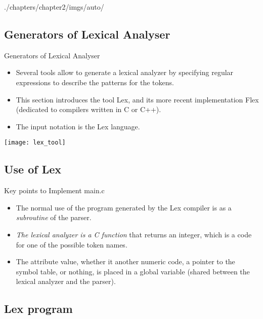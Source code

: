 \begin{graphicspathcontext}{{./chapters/chapter2/imgs/auto/}}
\begin{bibunit}[apalike]
\tableofcontentslide[sections={1-5},sectionstyle={show/shaded},subsectionstyle={show/show/hide},subsubsectionstyle={hide/hide/hide/hide}]

\subsection{Generators of Lexical Analyser}

\begin{frame}{Generators of Lexical Analyser}
	\begin{itemize}
	\item Several tools allow to generate a lexical analyzer by specifying regular expressions to describe the patterns for the tokens.
	\item This section introduces the tool Lex, and its more recent implementation Flex (dedicated to compilers written in C or C++).
	\item The input notation is the Lex language.
	\end{itemize}
	\vfill
	\texttt{[image: lex\_tool]}
\end{frame}

\subsection{Use of Lex}

\tableofcontentslide[sections={1-5},sectionstyle={show/shaded},subsectionstyle={show/shaded/hide},subsubsectionstyle={hide/hide/hide/hide}]


\begin{frame}{Key points to Implement main.c}
	\begin{itemize}
	\item The normal use of the program generated by the Lex compiler is as a \emph{subroutine} of the parser.
	\vfill
	\item \emph{The lexical analyzer is a C function} that returns an integer, which is a code for one of the possible token names.
	\vfill
	\item The attribute value, whether it another numeric code, a pointer to the symbol table, or nothing, is placed in a global variable  (shared between the lexical analyzer and the parser).
	\end{itemize}
\end{frame}

\subsection{Lex program}


\end{bibunit}
\end{graphicspathcontext}
